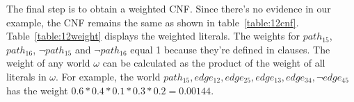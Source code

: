 

The final step is to obtain a weighted CNF. Since there's no evidence in our example, the CNF remains the same as shown in table~\ref{table:12cnf}. Table~\ref{table:12weight} displays the weighted literals. The weights for $path_{15}$, $path_{16}$, $\neg path_{15}$ and $\neg path_{16}$ equal 1 because they're defined in clauses. The weight of any world $\omega$ can be calculated as the product of the weight of all literals in $\omega$. For example, the world ${path_{15}, edge_{12}, edge_{25}, edge_{13}, edge_{34}, \neg edge_{45}}$ has the weight $0.6*0.4*0.1*0.3*0.2 = 0.00144$.

